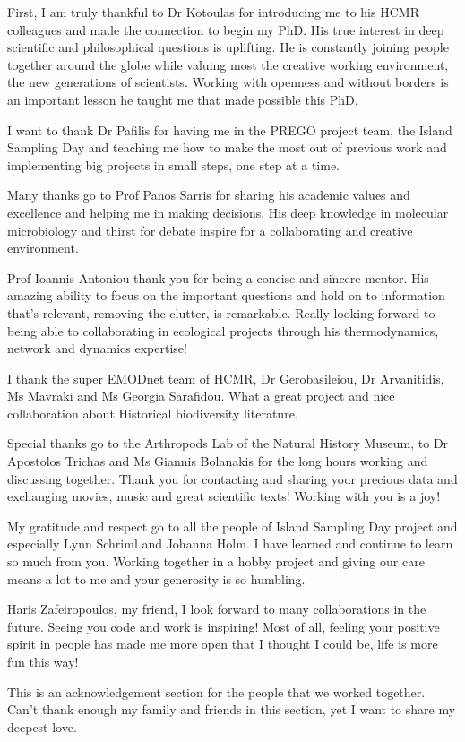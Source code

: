 \documentclass[
11pt, %
english, %
singlespacing, %
liststotoc, %
toctotoc, %
headsepline, %
]{MastersDoctoralThesis} %
\begin{document}
\begin{acknowledgements}
\addchaptertocentry{\acknowledgementname} %


First, I am truly thankful to Dr Kotoulas for introducing me to his HCMR colleagues and
made the connection to begin my PhD.
His true interest in deep scientific and philosophical questions is uplifting. He is constantly
joining people together around the globe while valuing most the creative working environment,
the new generations of scientists. Working with openness and without borders is an
important lesson he taught me that made possible this PhD.

I want to thank Dr Pafilis for having me in the PREGO project team, the Island Sampling
Day and teaching me how to make the most out
of previous work and implementing big projects in small steps, one step at a time.

Many thanks go to Prof Panos Sarris for sharing his academic values and excellence and helping me in making
decisions. His deep knowledge in molecular microbiology and thirst for debate inspire for
a collaborating and creative environment.

Prof Ioannis Antoniou thank you for being a concise and sincere mentor. His amazing ability to focus
on the important questions and hold on to information that's relevant, removing the clutter, 
is remarkable. Really looking forward to being able to collaborating in ecological 
projects through his thermodynamics, network and dynamics expertise!

I thank the super EMODnet team of HCMR, Dr Gerobasileiou, Dr Arvanitidis, Ms Mavraki and
Ms Georgia Sarafidou. What a great project and nice collaboration about Historical 
biodiversity literature.

Special thanks go to the Arthropods Lab of the Natural History Museum, to
Dr Apostolos Trichas and Ms Giannis Bolanakis for the long hours working and discussing together.
Thank you for contacting and sharing your 
precious data and exchanging movies, music and great scientific texts! Working with you is a joy!

My gratitude and respect go to all the people of Island Sampling Day project and especially
Lynn Schriml and Johanna Holm. I have learned and continue to learn so much from 
you. Working together in a hobby project and giving our care means a lot to me and your
generosity is so humbling.

Haris Zafeiropoulos, my friend, I look forward to many collaborations in the future. Seeing you code and work
is inspiring! Most of all, feeling your positive spirit in people has made me more
open that I thought I could be, life is more fun this way!

This is an acknowledgement section for the people that we worked together. Can't 
thank enough my family and friends in this section, yet I want to share my deepest love.

\end{acknowledgements}
\end{document}
